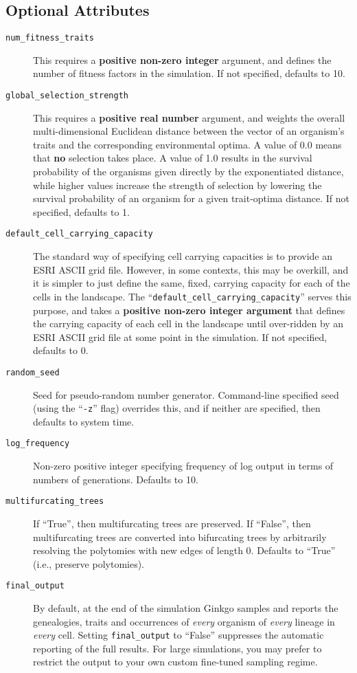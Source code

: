 \documentclass[11pt]{article}
\newcommand{\xmlattr}[1]{{\tt\textcolor{xmlattr}{#1}}}
\begin{document}
\subsection{Optional Attributes}
\begin{description}
	\item[\xmlattr{num\_fitness\_traits}] This requires a \textbf{positive non-zero integer} argument, and defines the number of fitness factors in the simulation. If not specified, defaults to 10.
	\item[\xmlattr{global\_selection\_strength}] This requires a \textbf{positive real number} argument, and weights the overall multi-dimensional Euclidean distance between the vector of an organism's traits and the corresponding environmental optima. A value of 0.0 means that \textbf{no} selection takes place. A value of 1.0 results in the survival probability of the organisms given directly by the exponentiated distance, while higher values increase the strength of selection by lowering the survival probability of an organism for a given trait-optima distance. If not specified, defaults to 1.
	\item[\xmlattr{default\_cell\_carrying\_capacity}] The standard way of specifying cell carrying capacities is to provide an ESRI ASCII grid file. However, in some contexts, this may be overkill, and it is simpler to just define the same, fixed, carrying capacity for each of the cells in the landscape. The ``\verb=default_cell_carrying_capacity='' serves this purpose, and takes a \textbf{positive non-zero integer argument} that defines the carrying capacity of each cell in the landscape until over-ridden by an ESRI ASCII grid file at some point in the simulation. If not specified, defaults to 0.
	\item[\xmlattr{random\_seed}] Seed for pseudo-random number generator. Command-line specified seed (using the ``{\tt -z}'' flag) overrides this, and if neither are specified, then defaults to system time.
	\item[\xmlattr{log\_frequency}] Non-zero positive integer specifying frequency of log output in terms of numbers of generations. Defaults to 10.
	\item[\xmlattr{multifurcating\_trees}] If ``True'', then multifurcating trees are preserved. If ``False'', then multifurcating trees are converted into bifurcating trees by arbitrarily resolving the polytomies with new edges of length 0. Defaults to ``True'' (i.e., preserve polytomies).
	\item[\xmlattr{final\_output}] By default, at the end of the simulation Ginkgo samples and reports the genealogies, traits and occurrences of \textit{every} organism of \textit{every} lineage in \textit{every} cell.  Setting \xmlattr{final\_output} to ``False'' suppresses the automatic reporting of the full results. For large simulations, you may prefer to restrict the output to your own custom fine-tuned sampling regime. 

\end{description}
\end{document}
